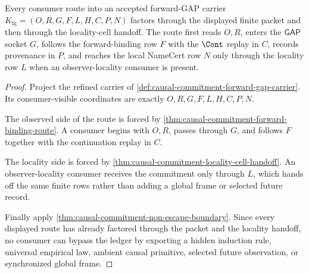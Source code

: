\begin{theorem}
\label{thm:causal-commitment-ledger-route-exactness}
Every consumer route into an accepted forward-GAP carrier $K_{\mathrm{fg}}=(O,R,G,F,L,H,C,P,N)$ factors through the displayed finite packet and then through the locality-cell handoff. The route first reads $O,R$, enters the $\mathsf{GAP}$ socket $G$, follows the forward-binding row $F$ with the $\Cont$ replay in $C$, records provenance in $P$, and reaches the local NameCert row $N$ only through the locality row $L$ when an observer-locality consumer is present.
\end{theorem}
\begin{proof}
Project the refined carrier of \autoref{def:causal-commitment-forward-gap-carrier}. Its consumer-visible coordinates are exactly $O,R,G,F,L,H,C,P,N$.

The observed side of the route is forced by \autoref{thm:causal-commitment-forward-binding-route}. A consumer begins with $O,R$, passes through $G$, and follows $F$ together with the continuation replay in $C$.

The locality side is forced by \autoref{thm:causal-commitment-locality-cell-handoff}. An observer-locality consumer receives the commitment only through $L$, which hands off the same finite rows rather than adding a global frame or selected future record.

Finally apply \autoref{thm:causal-commitment-non-escape-boundary}. Since every displayed route has already factored through the packet and the locality handoff, no consumer can bypass the ledger by exporting a hidden induction rule, universal empirical law, ambient causal primitive, selected future observation, or synchronized global frame.
\end{proof}

